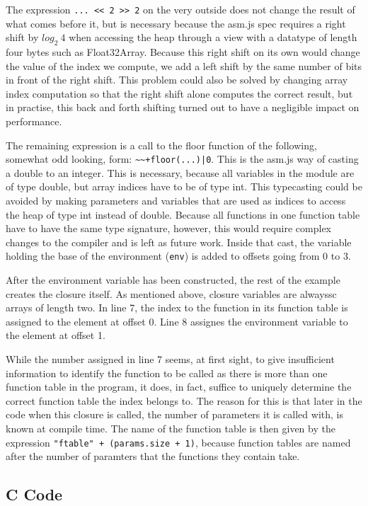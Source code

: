 \documentclass[11pt]{report}
\begin{document}
The expression \texttt{... {<}< 2 {>}> 2} on the very outside does not change the result of what comes before it, but is necessary because the asm.js spec requires a right shift by $log_2~4$ when accessing the heap through a view with a datatype of length four bytes such as Float32Array. Because this right shift on its own would change the value of the index we compute, we add a left shift by the same number of bits in front of the right shift. This problem could also be solved by changing array index computation so that the right shift alone computes the correct result, but in practise, this back and forth shifting turned out to have a negligible impact on performance.

The remaining expression is a call to the floor function of the following, somewhat odd looking, form: \texttt{\textasciitilde\textasciitilde+floor(...)|0}. This is the asm.js way of casting a double to an integer. This is necessary, because all variables in the module are of type double, but array indices have to be of type int. This typecasting could be avoided by making parameters and variables that are used as indices to access the heap of type int instead of double. Because all functions in one function table have to have the same type signature, however, this would require complex changes to the compiler and is left as future work. Inside that cast, the variable holding the base of the environment (\texttt{env}) is added to offsets going from $0$ to $3$. 

After the environment variable has been constructed, the rest of the example creates the closure itself. As mentioned above, closure variables are alwayssc arrays of length two. In line 7, the index to the function in its function table is assigned to the element at offset 0. Line 8 assignes the environment variable to the element at offset 1.

While the number assigned in line 7 seems, at first sight, to give insufficient information to identify the function to be called as there is more than one function table in the program, it does, in fact, suffice to uniquely determine the correct function table the index belongs to. The reason for this is that later in the code when this closure is called, the number of parameters it is called with, is known at compile time. The name of the function table is then given by the expression \texttt{"ftable" + (params.size + 1)}, because function tables are named after the number of paramters that the functions they contain take.


\subsection{C Code}
\end{document}
